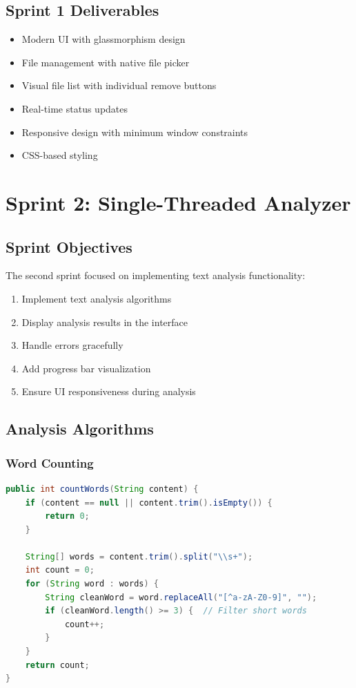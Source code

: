 \documentclass[12pt,a4paper]{report}
\begin{document}
\section{Sprint 1 Deliverables}
\begin{itemize}
    \item[$\checkmark$] Modern UI with glassmorphism design
    \item[$\checkmark$] File management with native file picker
    \item[$\checkmark$] Visual file list with individual remove buttons
    \item[$\checkmark$] Real-time status updates
    \item[$\checkmark$] Responsive design with minimum window constraints
    \item[$\checkmark$] CSS-based styling
\end{itemize}

\chapter{Sprint 2: Single-Threaded Analyzer}

\section{Sprint Objectives}
The second sprint focused on implementing text analysis functionality:
\begin{enumerate}
    \item Implement text analysis algorithms
    \item Display analysis results in the interface
    \item Handle errors gracefully
    \item Add progress bar visualization
    \item Ensure UI responsiveness during analysis
\end{enumerate}

\section{Analysis Algorithms}

\subsection{Word Counting}
\begin{lstlisting}[language=Java, caption=Word Counting Algorithm]
public int countWords(String content) {
    if (content == null || content.trim().isEmpty()) {
        return 0;
    }
    
    String[] words = content.trim().split("\\s+");
    int count = 0;
    for (String word : words) {
        String cleanWord = word.replaceAll("[^a-zA-Z0-9]", "");
        if (cleanWord.length() >= 3) {  // Filter short words
            count++;
        }
    }
    return count;
}
\end{lstlisting}
\end{document}
